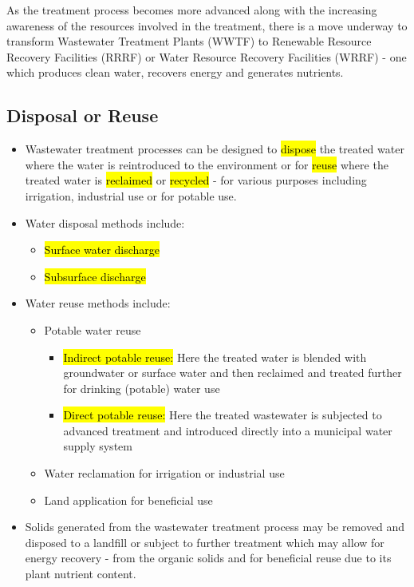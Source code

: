 As the treatment process becomes more advanced along with the increasing awareness of the resources involved in the treatment, there is a move underway to transform Wastewater Treatment Plants (WWTF) to Renewable Resource Recovery Facilities (RRRF) or Water Resource Recovery Facilities (WRRF) - one which produces clean water, recovers energy and generates nutrients.

\subsection{Disposal or Reuse}

\begin{itemize}
\item Wastewater treatment processes can be designed to \hl{dispose} the treated water where the water is reintroduced to the environment or for \hl{reuse} where the treated water is \hl{reclaimed} or \hl{recycled} - for various purposes including irrigation, industrial use or for potable use.
\item Water disposal methods include:\\
\begin{itemize}
\item \hl{Surface water discharge}
\item \hl{Subsurface discharge}
\end{itemize}
\item Water reuse methods include:\\
\begin{itemize}
\item Potable water reuse
\begin{itemize}
\item \hl{Indirect potable reuse:}  Here the treated water is blended with groundwater or surface water and then reclaimed and treated further 
for drinking (potable) water use
\item \hl{Direct potable reuse:}  Here the treated wastewater is subjected to advanced treatment and introduced directly into a municipal water supply system
\end{itemize}
\item Water reclamation for irrigation or industrial use\\
\item Land application for beneficial use\\
\end{itemize}
\item Solids generated from the wastewater treatment process may be removed and disposed to a landfill or subject to further treatment which may allow for energy recovery - from the organic solids and for beneficial reuse due to its plant nutrient content.\\
\end{itemize}








